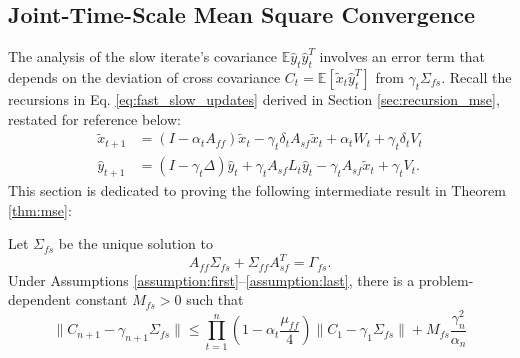 \subsection{Joint-Time-Scale Mean Square Convergence}\label{sec:joint_mse}
The analysis of the slow iterate's covariance $\mathbb{E} \hat{y}_t \hat{y}_t^T$ involves an error term that depends on the deviation of cross covariance $C_t = \mathbb{E} [\tilde{x}_t \hat{y}_t^T]$ from $\gamma_t \Sigma_{fs}$. 
Recall the recursions in Eq. \eqref{eq:fast_slow_updates} derived in Section \ref{sec:recursion_mse}, restated for reference below:
\begin{align*}
    \tilde{x}_{t+1} &= (I - \alpha_t A_{ff}) \tilde{x}_t - \gamma_t \delta_t A_{sf} \tilde{x}_t + \alpha_t W_t + \gamma_t \delta_t V_t \\ 
    \hat{y}_{t+1} &= (I - \gamma_t \Delta) \hat{y}_t + \gamma_t A_{sf} L_t \hat{y}_t - \gamma_t A_{sf} \tilde{x}_t + \gamma_t V_t .
\end{align*}
This section is dedicated to proving the following intermediate result in Theorem \ref{thm:mse}:
\begin{lemma}\label{lem:joint_mse}
    Let $\Sigma_{fs}$ 
    be the unique solution to
    \begin{equation}\label{eq:joint_covariance}
        A_{ff} \Sigma_{fs} + \Sigma_{ff} A_{sf}^T = \Gamma_{fs} .
    \end{equation}
    Under Assumptions \ref{assumption:first}--\ref{assumption:last}, 
    there is a problem-dependent constant $M_{fs} > 0$ such that
    \begin{equation}
        \lVert C_{n+1} - \gamma_{n+1} \Sigma_{fs} \rVert 
        \leq 
    \prod_{t=1}^n \left(1 - \alpha_t \frac{\mu_{ff}}{4}\right) \lVert C_1 - \gamma_1 \Sigma_{fs} \rVert         
        + M_{fs} \frac{\gamma_{n}^2}{\alpha_n}
    \end{equation}
\end{lemma}

